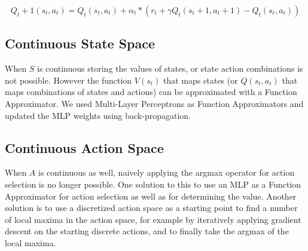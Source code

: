 \begin{equation}
\label{eq:upd_q}
Q_t+1(s_t,a_t) = Q_t(s_t,a_t) + \alpha_t*(r_t + \gamma Q_t(s_t+1,a_t+1) - Q_t(s_t, a_t))
\end{equation}

\subsection{Continuous State Space}

When $S$ is continuous storing the values of states, or state action combinations is not possible. However the function $V(s_t)$ that maps states (or $Q(s_t,a_t)$ that maps combinations
of states and actions) can be approximated with a Function Approximator. We used Multi-Layer Perceptrons as Function Approximators and updated the MLP weights using back-propagation.

\subsection{Continuous Action Space}

When $A$ is continuous as well, naively applying the argmax operator for action selection is no longer possible. One solution to this to use an MLP as a Function Approximator for action selection as well as
for determining the value. Another solution is to use a discretized action space as a starting point to find a number of local maxima in the action space, for example by iteratively applying gradient descent on the
starting discrete actions, and to finally take the argmax of the local maxima.

